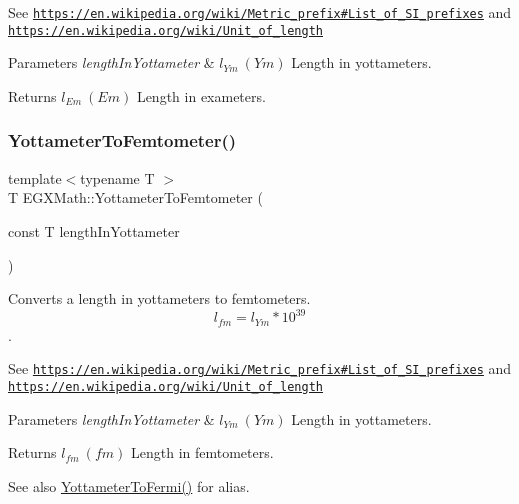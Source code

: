 See \href{https://en.wikipedia.org/wiki/Metric_prefix#List_of_SI_prefixes}{\tt https\+://en.\+wikipedia.\+org/wiki/\+Metric\+\_\+prefix\#\+List\+\_\+of\+\_\+\+S\+I\+\_\+prefixes} and \href{https://en.wikipedia.org/wiki/Unit_of_length}{\tt https\+://en.\+wikipedia.\+org/wiki/\+Unit\+\_\+of\+\_\+length} 
\begin{DoxyParams}{Parameters}
{\em length\+In\+Yottameter} & $ l_{Ym}\ (Ym)$ Length in yottameters. \\
\hline
\end{DoxyParams}
\begin{DoxyReturn}{Returns}
$ l_{Em}\ (Em)$ Length in exameters. 
\end{DoxyReturn}
\mbox{\label{group___e_g_x_math-_conversions-_length_conversions-_yottameter-_s_i_ga02dbecce4d520a89139e6de0e2fec6d9}} 
\subsubsection{\texorpdfstring{Yottameter\+To\+Femtometer()}{YottameterToFemtometer()}}
{\footnotesize\ttfamily template$<$typename T $>$ \\
T E\+G\+X\+Math\+::\+Yottameter\+To\+Femtometer (\begin{DoxyParamCaption}\item[{const T}]{length\+In\+Yottameter }\end{DoxyParamCaption})}



Converts a length in yottameters to femtometers. \[ l_{fm}=l_{Ym} * 10^{39} \]. 

See \href{https://en.wikipedia.org/wiki/Metric_prefix#List_of_SI_prefixes}{\tt https\+://en.\+wikipedia.\+org/wiki/\+Metric\+\_\+prefix\#\+List\+\_\+of\+\_\+\+S\+I\+\_\+prefixes} and \href{https://en.wikipedia.org/wiki/Unit_of_length}{\tt https\+://en.\+wikipedia.\+org/wiki/\+Unit\+\_\+of\+\_\+length} 
\begin{DoxyParams}{Parameters}
{\em length\+In\+Yottameter} & $ l_{Ym}\ (Ym)$ Length in yottameters. \\
\hline
\end{DoxyParams}
\begin{DoxyReturn}{Returns}
$ l_{fm}\ (fm)$ Length in femtometers. 
\end{DoxyReturn}
\begin{DoxySeeAlso}{See also}
\mbox{\hyperlink{group___e_g_x_math-_conversions-_length_conversions-_yottameter-_non-_s_i_gabf900c05975691fab8c5df7de16a467c}{Yottameter\+To\+Fermi()}} for alias. 
\end{DoxySeeAlso}
\mbox{\label{group___e_g_x_math-_conversions-_length_conversions-_yottameter-_s_i_ga206834b7977e8b15c0fe06e279655c2b}} 
